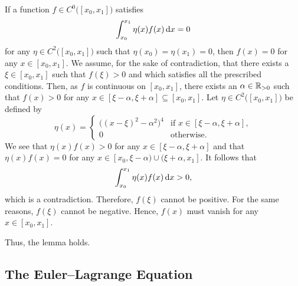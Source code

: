   \label{lm01}
  If a function \(f \in C^0\big([x_0, x_1]\big)\) satisfies
  \[
    \int_{x_0}^{x_1} \eta(x) f(x) \mathop{}\!\mathrm{d} x = 0
  \]
  for any \(\eta \in C^2\big([x_0, x_1]\big)\) such that \(\eta(x_0) = \eta(x_1) = 0\), then \(f(x) = 0\) for any
  \(x \in [x_0, x_1]\).
\Elm
\Bpr
  We assume, for the sake of contradiction, that there exists a \(\xi \in [x_0, x_1]\) such that \(f(\xi) > 0\) and
  which satisfies all the prescribed conditions. Then, as \(f\) is continuous on \([x_0, x_1]\), there exists an
  \(\alpha \in \mathbb{R}_{>0}\) such that \(f(x) > 0\) for any \(x \in [\xi - \alpha, \xi + \alpha] \subseteq [x_0, x_1]\).
  Let \(\eta \in C^2\big([x_0, x_1]\big)\) be defined by
  \[
    \eta(x) = \begin{cases}
      \big((x - \xi)^2 - \alpha^2\big)^4 & \text{if } x \in [\xi - \alpha, \xi + \alpha],\\
      0 & \text{otherwise}.
    \end{cases}
  \]
  We see that \(\eta(x) f(x) > 0\) for any \(x \in [\xi - \alpha, \xi + \alpha]\) and that \(\eta(x) f(x) = 0\) for any
  \(x \in [x_0, \xi - \alpha) \cup (\xi + \alpha, x_1]\). It follows that
  \[
    \int_{x_0}^{x_1} \eta(x) f(x) \mathop{}\!\mathrm{d} x > 0,
  \]
  which is a contradiction. Therefore, \(f(\xi)\) cannot be positive. For the same reasons, \(f(\xi)\) cannot be
  negative. Hence, \(f(x)\) must vanish for any \(x \in [x_0, x_1]\).

  Thus, the lemma holds.
\Epr

\subsection{The Euler--Lagrange Equation}

